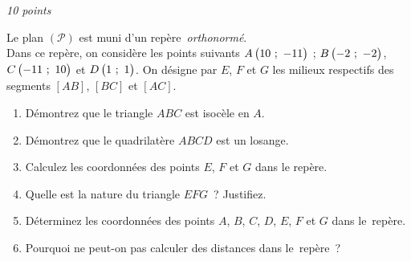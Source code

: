 \documentclass[a4paper,12pt,twocolumn,landscape]{article}
\begin{document}
\vspace*{1em}

\begin{minipage}{0.45\textwidth}
\thispagestyle{firststyle}

\vspace*{1em}

%


\exercice\hfill \emph{10 points}

Le plan $\left(\mathscr{P}\right)$ est muni d'un repère~\emph{orthonormé}.\\ Dans ce repère, on considère les points suivants $A\begin{pmatrix}10~;~-11\end{pmatrix}$ ; $B\begin{pmatrix}-2~;~-2\end{pmatrix}$, $C\begin{pmatrix}-11~;~10\end{pmatrix}$ et $D\begin{pmatrix}1~;~1\end{pmatrix}$.
On désigne par $E$, $F$ et $G$ les milieux respectifs des segments $\left[AB\right]$,  $\left[BC\right]$ et $\left[AC\right]$.

\begin{enumerate}
	\item Démontrez que le triangle $ABC$ est isocèle en $A$.
	\item Démontrez que le quadrilatère $ABCD$ est un losange.
	\item Calculez les coordonnées des points $E$, $F$ et $G$ dans le repère.
	\item Quelle est la nature du triangle $EFG$~? Justifiez.
	\item Déterminez les coordonnées des points $A$, $B$, $C$, $D$, $E$, $F$ et $G$ dans le~repère.
	\item Pourquoi ne peut-on pas calculer des distances dans le~repère~?
\end{enumerate}


\end{minipage}
\end{document}
